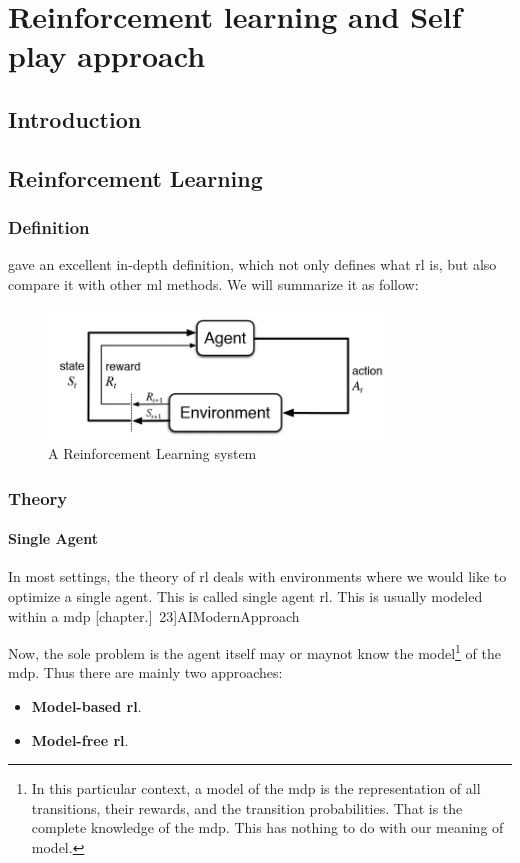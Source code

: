 \chapter{Reinforcement learning and Self play approach}
\section{Introduction}
\section{Reinforcement Learning}
\subsection{Definition}
\citeauthor{RLIntroduction} \cite[Chapter.~1]{RLIntroduction} gave an excellent in-depth definition, which not only defines what \acrfull{rl} is, but also compare it with other \acrfull{ml} methods.
\newline We will summarize it as follow:
\begin{definition}
	
\end{definition}
\begin{figure}
	\centering
	\includegraphics[width= 0.8\textwidth]{Figures/RLDiagram.png}
	\caption{A Reinforcement Learning system}
\end{figure}
\subsection{Theory}
\subsubsection{Single Agent}
In most settings, the theory of \acrshort{rl} deals with environments where we would like to optimize a single agent. This is called single agent \acrshort{rl}. This is usually modeled within a \acrfull{mdp}
\parencites[chapter.~3]{RLIntroduction}[chapter.]~23]{AIModernApproach}

Now, the sole problem is the agent itself may or maynot know the model\footnote{In this particular context, a model of the \acrshort{mdp} is the representation of all transitions, their rewards, and the transition probabilities. That is the complete knowledge of the \acrshort{mdp}. This has nothing to do with our meaning of model.} of the \acrshort{mdp}. Thus there are mainly two approaches:
\begin{itemize}
	\item \textbf{Model-based \acrshort{rl}}.
	\item \textbf{Model-free \acrshort{rl}}. 
\end{itemize}

